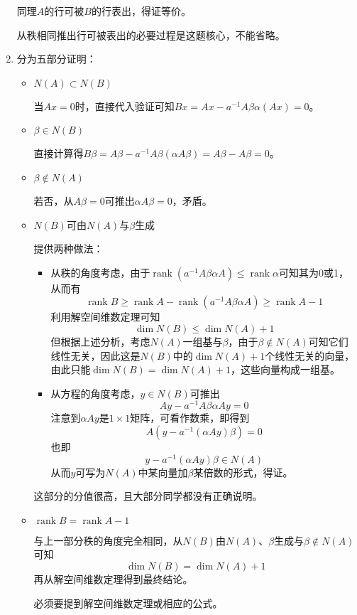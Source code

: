 \documentclass[a4paper,UTF8,fontset=windows]{ctexart}
\DeclareMathOperator{\rank}{rank}
\newcommand*{\note}{\noindent *}
\begin{document}
\begin{enumerate}
    同理$A$的行可被$B$的行表出，得证等价。

    \note 从秩相同推出行可被表出的必要过程是这题核心，不能省略。

    \item 分为五部分证明：
    \begin{itemize}
        \item $N(A)\subset N(B)$
        
        当$Ax=0$时，直接代入验证可知$Bx=Ax-a^{-1}A\beta\alpha(Ax)=0$。

        \item $\beta\in N(B)$
        
        直接计算得$B\beta=A\beta-a^{-1}A\beta(\alpha A\beta)=A\beta-A\beta=0$。

        \item $\beta\notin N(A)$
        
        若否，从$A\beta=0$可推出$\alpha A\beta=0$，矛盾。

        \item $N(B)$可由$N(A)$与$\beta$生成

        提供两种做法：
        \begin{itemize}
            \item 从秩的角度考虑，由于$\rank(a^{-1}A\beta\alpha A)\le\rank\alpha$可知其为0或1，从而有
            $$\rank B\ge\rank A-\rank(a^{-1}A\beta\alpha A)\ge\rank A-1$$
            利用解空间维数定理可知
            $$\dim N(B)\le\dim N(A)+1$$
            但根据上述分析，考虑$N(A)$一组基与$\beta$，由于$\beta\notin N(A)$可知它们线性无关，因此这是$N(B)$中的$\dim N(A)+1$个线性无关的向量，由此只能$\dim N(B)=\dim N(A)+1$，这些向量构成一组基。

            \item 从方程的角度考虑，$y\in N(B)$可推出
            $$Ay-a^{-1}A\beta\alpha Ay=0$$
            注意到$\alpha Ay$是$1\times 1$矩阵，可看作数乘，即得到
            $$A(y-a^{-1}(\alpha Ay)\beta)=0$$
            也即
            $$y-a^{-1}(\alpha Ay)\beta\in N(A)$$
            从而$y$可写为$N(A)$中某向量加$\beta$某倍数的形式，得证。
        \end{itemize}

        \note 这部分的分值很高，且大部分同学都没有正确说明。

        \item $\rank B=\rank A-1$
        
        与上一部分秩的角度完全相同，从$N(B)$由$N(A)$、$\beta$生成与$\beta\notin N(A)$可知
        $$\dim N(B)=\dim N(A)+1$$
        再从解空间维数定理得到最终结论。

        \note 必须要提到解空间维数定理或相应的公式。
    \end{itemize}
\end{enumerate}
\end{document}
